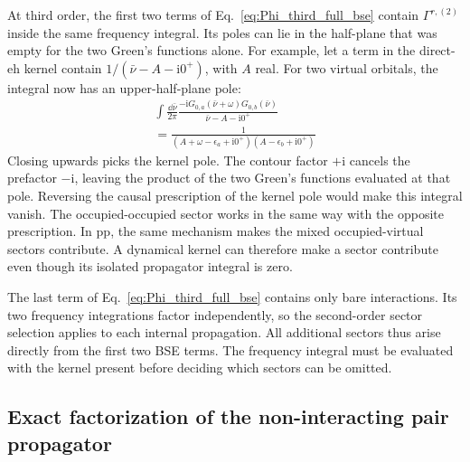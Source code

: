 \documentclass[aip,jcp,reprint,noshowkeys,superscriptaddress]{revtex4-1}
\newcommand{\eps}{\epsilon}
\newcommand{\ii}{\mathrm{i}}
\newcommand{\eh}{\text{eh}}
\newcommand{\pp}{\text{pp}}
\begin{document}
At third order, the first two terms of
Eq.~\eqref{eq:Phi_third_full_bse} contain $\Gamma^{r,(2)}$ inside the
same frequency integral. Its poles can lie in the half-plane that was
empty for the two Green's functions alone.
For example, let a term in the direct-$\eh$ kernel contain
$1/(\bar\nu-A-\ii0^+)$, with $A$ real.
For two virtual orbitals, the integral now has an upper-half-plane pole:
\begin{multline}
    \int\frac{\dd{\bar\nu}}{2\pi}
    \frac{-\ii G_{0,a}(\bar\nu+\omega)G_{0,b}(\bar\nu)}
    {\bar\nu-A-\ii0^+}
    \\
    =\frac{1}{(A+\omega-\eps_a+\ii0^+)
    (A-\eps_b+\ii0^+)}
    \label{eq:dynamic_sector_example}
\end{multline}
Closing upwards picks the kernel pole. The contour factor $+\ii$
cancels the prefactor $-\ii$, leaving the product of the two Green's
functions evaluated at that pole. Reversing the causal
prescription of the kernel pole would make this integral vanish.
The occupied-occupied sector works in the same way with the opposite
prescription. In $\pp$, the same mechanism makes the mixed
occupied-virtual sectors contribute.
A dynamical kernel can therefore make a sector contribute even though
its isolated propagator integral is zero.


The last term of Eq.~\eqref{eq:Phi_third_full_bse} contains only bare
interactions. Its two frequency integrations factor independently,
so the second-order sector selection applies to each internal propagation.
All additional sectors thus arise directly from the first two BSE terms.
The frequency integral must be evaluated with the kernel present before
deciding which sectors can be omitted.

\subsection{Exact factorization of the non-interacting pair propagator}
\end{document}
